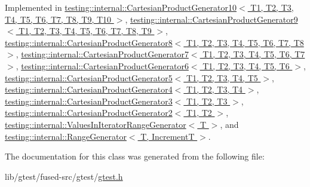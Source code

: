 Implemented in \hyperlink{classtesting_1_1internal_1_1_cartesian_product_generator10_ab8a229952b2bf4ab2eb6f444bc4c4cee}{testing\-::internal\-::\-Cartesian\-Product\-Generator10$<$ T1, T2, T3, T4, T5, T6, T7, T8, T9, T10 $>$}, \hyperlink{classtesting_1_1internal_1_1_cartesian_product_generator9_af00c2840f7270a74c2104fead936498e}{testing\-::internal\-::\-Cartesian\-Product\-Generator9$<$ T1, T2, T3, T4, T5, T6, T7, T8, T9 $>$}, \hyperlink{classtesting_1_1internal_1_1_cartesian_product_generator8_a2a6e4ba6ad072f85c1193e1d17983f5f}{testing\-::internal\-::\-Cartesian\-Product\-Generator8$<$ T1, T2, T3, T4, T5, T6, T7, T8 $>$}, \hyperlink{classtesting_1_1internal_1_1_cartesian_product_generator7_a3b5e8c49981d86e7691bf267b687a47a}{testing\-::internal\-::\-Cartesian\-Product\-Generator7$<$ T1, T2, T3, T4, T5, T6, T7 $>$}, \hyperlink{classtesting_1_1internal_1_1_cartesian_product_generator6_acea48e3f002281d8f8abcd5e586dce92}{testing\-::internal\-::\-Cartesian\-Product\-Generator6$<$ T1, T2, T3, T4, T5, T6 $>$}, \hyperlink{classtesting_1_1internal_1_1_cartesian_product_generator5_a8603bd7755d52d89f6e12744b46a9333}{testing\-::internal\-::\-Cartesian\-Product\-Generator5$<$ T1, T2, T3, T4, T5 $>$}, \hyperlink{classtesting_1_1internal_1_1_cartesian_product_generator4_ae754e777c3d8f93578d32af2721d069b}{testing\-::internal\-::\-Cartesian\-Product\-Generator4$<$ T1, T2, T3, T4 $>$}, \hyperlink{classtesting_1_1internal_1_1_cartesian_product_generator3_a3ec67f2625c4bf090308e8f5fc511838}{testing\-::internal\-::\-Cartesian\-Product\-Generator3$<$ T1, T2, T3 $>$}, \hyperlink{classtesting_1_1internal_1_1_cartesian_product_generator2_a3b02163a9c9d5f0e930b0740de7e876a}{testing\-::internal\-::\-Cartesian\-Product\-Generator2$<$ T1, T2 $>$}, \hyperlink{classtesting_1_1internal_1_1_values_in_iterator_range_generator_aa838affa584afa9f91c44f9d1c0509c4}{testing\-::internal\-::\-Values\-In\-Iterator\-Range\-Generator$<$ T $>$}, and \hyperlink{classtesting_1_1internal_1_1_range_generator_a9af92f542fa637b38b82ab240d2d426e}{testing\-::internal\-::\-Range\-Generator$<$ T, Increment\-T $>$}.



The documentation for this class was generated from the following file\-:\begin{DoxyCompactItemize}
\item 
lib/gtest/fused-\/src/gtest/\hyperlink{fused-src_2gtest_2gtest_8h}{gtest.\-h}\end{DoxyCompactItemize}
